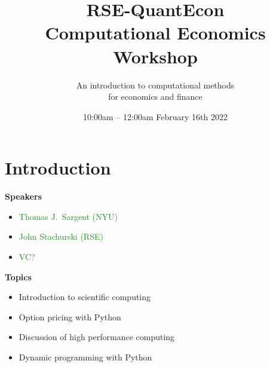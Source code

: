 \documentclass[
    xcolor={svgnames,dvipsnames},
    hyperref={colorlinks, citecolor=DeepPink4, linkcolor=DarkRed, urlcolor=DarkBlue}
    ]{beamer}  %
\title{RSE-QuantEcon \\
    Computational Economics Workshop}
\author{An introduction to computational methods \\ for economics and finance}
\date{10:00am -- 12:00am February 16th 2022}
\newcommand{\green}[1]{\textcolor{ForestGreen}{\sf #1}}
\newcommand{\1}{\mathbbm 1}
\begin{document}
\begin{frame}
  \titlepage
\end{frame}





\section{Introduction}








\begin{frame}

    \textbf{Speakers}

    \begin{itemize}
        \item \green{Thomas J.\ Sargent (NYU)}
            \vspace{0.5em}
        \item \green{John Stachurski (RSE)}
            \vspace{0.5em}
        \item \green{VC?}
            \vspace{0.5em}
    \end{itemize}

    \textbf{Topics}

    \begin{itemize}
        \item Introduction to scientific computing
        \vspace{0.5em}
        \item Option pricing with Python
        \vspace{0.5em}
        \item Discussion of high performance computing
        \vspace{0.5em}
        \item Dynamic programming with Python
    \end{itemize}

\end{frame}
\end{document}
